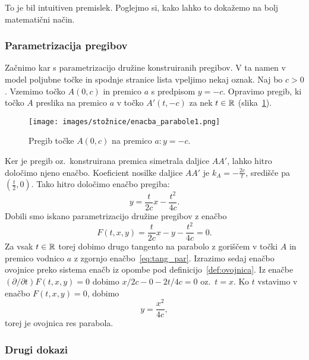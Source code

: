 To je bil intuitiven premislek. Poglejmo si, kako lahko to dokažemo na bolj matematični način.

\subsubsection*{Parametrizacija pregibov}

Začnimo kar s parametrizacijo družine konstruiranih pregibov. V ta namen v model poljubne točke in spodnje stranice lista vpeljimo nekaj oznak. Naj bo $c > 0$. Vzemimo točko $A(0, c)$ in premico $a$ s predpisom $y = -c$. Opravimo pregib, ki točko $A$ preslika na premico $a$ v točko $A'(t, -c)$ za nek $t \in \mathbb R$ (slika~\ref{fig:enacba_tangente_par1}).

\begin{figure}[h]
    \centering
    \texttt{[image: images/stožnice/enacba\_parabole1.png]}
    \caption[Enačba tangente na parabolo]{Pregib točke $A(0, c)$ na premico $a: y = -c$.}
    \label{fig:enacba_tangente_par1}
\end{figure}

Ker je pregib oz.\ konstruirana premica simetrala daljice $AA'$, lahko hitro določimo njeno enačbo. Koeficient nosilke daljice $AA'$ je $k_A = -\frac{2c}{t}$, središče pa $(\frac{t}{2}, 0)$. Tako hitro določimo enačbo pregiba:
\begin{equation}
    y = \frac{t}{2c} x - \frac{t^2}{4c}.
    \label{eq:tang_par}
\end{equation}
Dobili smo iskano parametrizacijo družine pregibov z enačbo
$$F(t, x, y) = \frac{t}{2c} x - y - \frac{t^2}{4c} = 0. $$
Za vsak $t \in \mathbb R$ torej dobimo drugo tangento na parabolo z goriščem v točki $A$ in premico vodnico $a$ z zgornjo enačbo~\eqref{eq:tang_par}. Izrazimo sedaj enačbo ovojnice preko sistema enačb iz opombe pod definicijo~\ref{def:ovojnica}. Iz enačbe $(\partial / \partial t) F(t, x, y) = 0$ dobimo $x/2c - 0 - 2t/4c = 0$ oz.\ $t = x$. Ko $t$ vstavimo v enačbo $F(t, x, y) = 0$, dobimo
\begin{equation}
    \label{eq:parabola_splosna}
    y = \frac{x^2}{4c},
\end{equation}
torej je ovojnica res parabola. %

\subsubsection*{Drugi dokazi}

